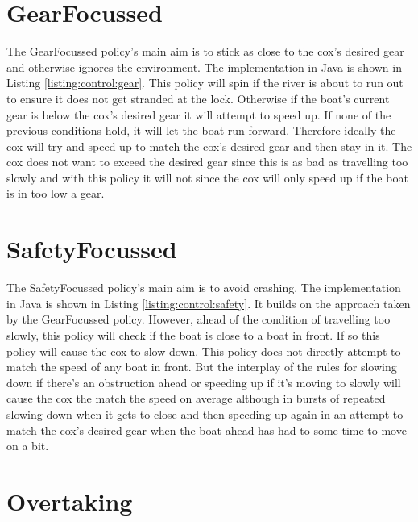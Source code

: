 \section{GearFocussed}

The GearFocussed policy's main aim is to stick as close to the cox's desired gear and otherwise ignores the environment. The implementation in Java is shown in Listing \ref{listing:control:gear}. This policy will spin if the river is about to run out to ensure it does not get stranded at the lock. Otherwise if the boat's current gear is below the cox's desired gear it will attempt to speed up. If none of the previous conditions hold, it will let the boat run forward. Therefore ideally the cox will try and speed up to match the cox's desired gear and then stay in it. The cox does not want to exceed the desired gear since this is as bad as travelling too slowly and with this policy it will not since the cox will only speed up if the boat is in too low a gear.



\section{SafetyFocussed}

The SafetyFocussed policy's main aim is to avoid crashing. The implementation in Java is shown in Listing \ref{listing:control:safety}. It builds on the approach taken by the GearFocussed policy. However, ahead of the condition of travelling too slowly, this policy will check if the boat is close to a boat in front. If so this policy will cause the cox to slow down. This policy does not directly attempt to match the speed of any boat in front. But the interplay of the rules for slowing down if there's an obstruction ahead or speeding up if it's moving to slowly will cause the cox the match the speed on average although in bursts of repeated slowing down when it gets to close and then speeding up again in an attempt to match the cox's desired gear when the boat ahead has had to some time to move on a bit.



\section{Overtaking}

